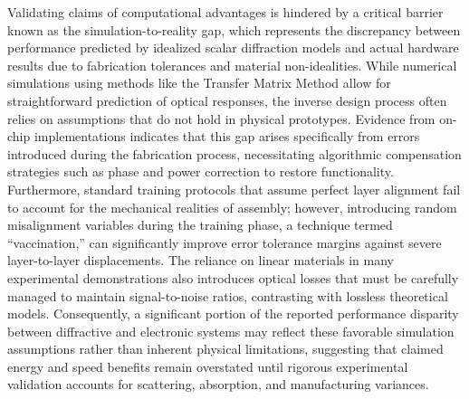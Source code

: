 \documentclass[11pt]{article}
\begin{document}
Validating claims of computational advantages is hindered by a critical barrier known as the simulation-to-reality gap, which represents the discrepancy between performance predicted by idealized scalar diffraction models and actual hardware results due to fabrication tolerances and material non-idealities. \citep{doi_10_1117_12_3013482_d44587c1} \citep{doi_10_1117_12_3084472_3a4f4f5d} While numerical simulations using methods like the Transfer Matrix Method allow for straightforward prediction of optical responses, the inverse design process often relies on assumptions that do not hold in physical prototypes. Evidence from on-chip implementations indicates that this gap arises specifically from errors introduced during the fabrication process, necessitating algorithmic compensation strategies such as phase and power correction to restore functionality. Furthermore, standard training protocols that assume perfect layer alignment fail to account for the mechanical realities of assembly; however, introducing random misalignment variables during the training phase, a technique termed ``vaccination,'' can significantly improve error tolerance margins against severe layer-to-layer displacements. \citep{doi_10_1515_nanoph_2020_0291_c4a9f42d} The reliance on linear materials in many experimental demonstrations also introduces optical losses that must be carefully managed to maintain signal-to-noise ratios, contrasting with lossless theoretical models. Consequently, a significant portion of the reported performance disparity between diffractive and electronic systems may reflect these favorable simulation assumptions rather than inherent physical limitations, suggesting that claimed energy and speed benefits remain overstated until rigorous experimental validation accounts for scattering, absorption, and manufacturing variances. \citep{doi_10_1016_j_isci_2025_112222_1f7c10f5} \citep{doi_10_1038_s41598_025_19638_8_1b2db1c9} \citep{doi_10_1515_nanoph_2020_0291_c4a9f42d} \citep{doi_10_1126_science_aat8084_e055772d} \citep{s2_94f3822c453a2ab6d44c59f1f60026acb15739af_1ae3e4a4}
\end{document}
